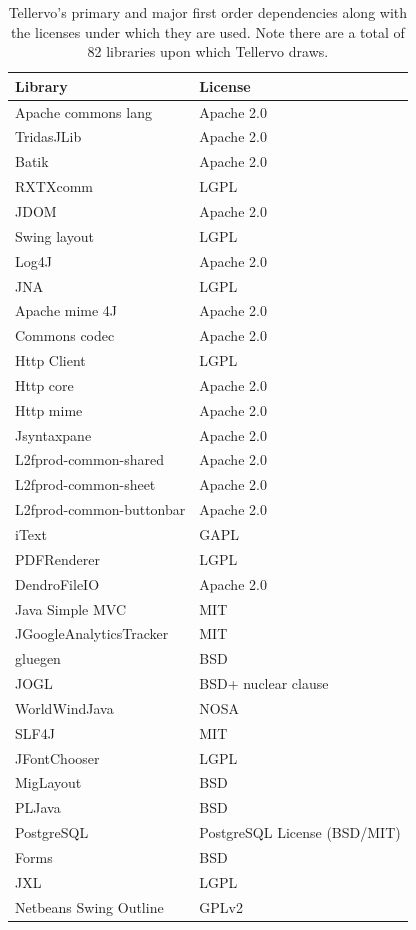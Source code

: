 \begin{table}[htbp]
\centering
{}
\begin{tabular*}{0.6\textwidth}{ll}
\toprule
Library & License \\
\midrule
Apache commons lang & Apache 2.0 \\
TridasJLib & Apache 2.0 \\
Batik & Apache 2.0 \\ 
RXTXcomm & LGPL\\
JDOM & Apache 2.0\\
Swing layout & LGPL\\
Log4J & Apache 2.0\\
JNA & LGPL\\
Apache mime 4J & Apache 2.0\\
Commons codec & Apache 2.0\\
Http Client &LGPL\\
Http core & Apache 2.0\\
Http mime &Apache 2.0\\
Jsyntaxpane & Apache 2.0\\
L2fprod-common-shared &Apache 2.0\\
L2fprod-common-sheet &Apache 2.0\\
L2fprod-common-buttonbar &Apache 2.0\\
iText &GAPL\\
PDFRenderer & LGPL\\
DendroFileIO & Apache 2.0\\
Java Simple MVC & MIT\\
JGoogleAnalyticsTracker & MIT\\
gluegen & BSD\\
JOGL & BSD+ nuclear clause\\
WorldWindJava & NOSA \\
SLF4J & MIT\\
JFontChooser & LGPL\\
MigLayout & BSD\\
PLJava & BSD\\
PostgreSQL & PostgreSQL License (BSD/MIT)\\
Forms & BSD\\
JXL & LGPL\\
Netbeans Swing Outline & GPLv2\\
\bottomrule
\end{tabular*}
\captionsetup{width=0.6\textwidth}
\caption{Tellervo's primary and major first order dependencies along with the licenses under which they are used.  Note there are a total of 82 libraries upon which Tellervo draws.}
\label{tbl:desktopDependencies}
\end{table}


